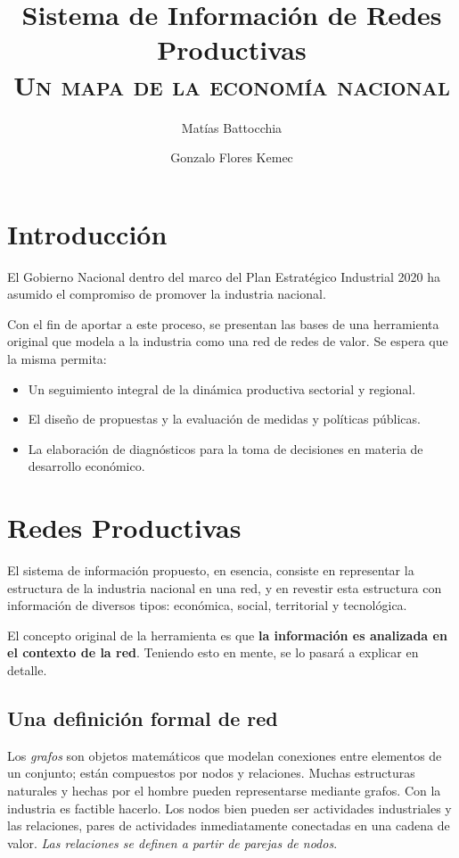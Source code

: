 \documentclass[a4paper]{report}
\begin{document}
\title{Sistema de Información de Redes Productivas\\\textsc{Un mapa de la economía nacional}}
\author{Matías Battocchia}
\author{Gonzalo Flores Kemec}

\maketitle

\section*{Introducción}

El Gobierno Nacional dentro del marco del Plan Estratégico Industrial 2020 ha asumido el compromiso de promover la industria nacional.

Con el fin de aportar a este proceso, se presentan las bases de una herramienta original que modela a la industria como una red de redes de valor. Se espera que la misma permita:

\begin{itemize}
  \item Un seguimiento integral de la dinámica productiva sectorial y regional.
  \item El diseño de propuestas y la evaluación de medidas y políticas públicas.
  \item La elaboración de diagnósticos para la toma de decisiones en materia de desarrollo económico.
\end{itemize}

\section*{Redes Productivas}

El sistema de información propuesto, en esencia, consiste en representar la estructura de la industria nacional en una red, y en revestir esta estructura con información de diversos tipos: económica, social, territorial y tecnológica. 

El concepto original de la herramienta es que \textbf{la información es analizada en el contexto de la red}. Teniendo esto en mente, se lo pasará a explicar en detalle.

\subsection*{Una definición formal de red}

Los \textit{grafos} son objetos matemáticos que modelan conexiones entre elementos de un conjunto; están compuestos por nodos y relaciones. Muchas estructuras naturales y hechas por el hombre pueden representarse mediante grafos. Con la industria es factible hacerlo. Los nodos bien pueden ser actividades industriales y las relaciones, pares de actividades inmediatamente conectadas en una cadena de valor. \textit{Las relaciones se definen a partir de parejas de nodos}.
\end{document}
